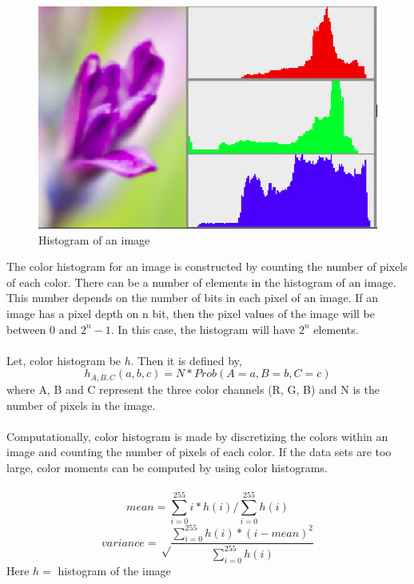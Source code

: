 \documentclass{report}
\begin{document}
\begin{figure}[!h]
\centering
        \includegraphics[width=.8\linewidth]{hist_example.png}
    \caption{Histogram of an image}
    \label{fig:verticalcell}
\end{figure}
The color histogram for an image is constructed by counting the number of pixels of each color. There can be a number of elements in the histogram of an image. This number depends on the number of bits in each pixel of an image. If an image has a pixel depth on n bit, then the pixel values of the image will be between $0$  and $2^n-1$. In this case, the histogram will have $2^{n}$ elements.\\
\\
Let, color histogram be $h$. Then it is defined by,\\
\begin{equation}
h_{A,B,C}(a,b,c)=N*Prob(A=a,B=b,C=c)\label{eq:4}
\end{equation}
where A, B and C represent the three color channels (R, G, B) and N is the number of pixels in the image.\\
\\
Computationally, color histogram is made by discretizing the colors within an image and counting the number of pixels of each color. If the data sets are too large, color moments can be computed  by using color histograms.\\
\\ 
\begin{equation}
mean=\sum_{i=0}^{255}i*h(i)/\sum_{i=0}^{255}h(i)\label{eq:5}
\end{equation}
\begin{equation}
variance=\sqrt \frac{\displaystyle \sum_{i=0}^{255}h(i)*(i-mean)^2}{\displaystyle\sum_{i=0}^{255}h(i)}\label{eq:6}
\end{equation}
Here $h=$ histogram of the image\\
\end{document}
